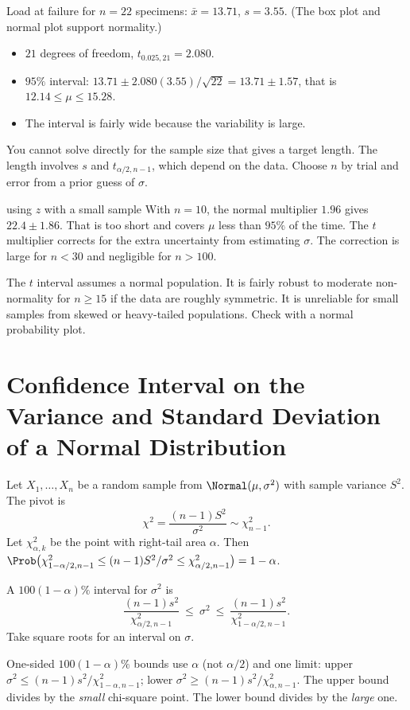 \begin{example}
Load at failure for $n=22$ specimens: $\bar{x}=13.71$, $s=3.55$. (The box plot and normal plot support normality.)
\begin{itemize}
  \item $21$ degrees of freedom, $t_{0.025,21}=2.080$.
  \item $95\%$ interval: $13.71\pm2.080(3.55)/\sqrt{22}=13.71\pm1.57$, that is $12.14\le\mu\le15.28$.
  \item The interval is fairly wide because the variability is large.
\end{itemize}
You cannot solve directly for the sample size that gives a target length. The length involves $s$ and $t_{\alpha/2,n-1}$, which depend on the data. Choose $n$ by trial and error from a prior guess of $\sigma$.
\end{example}

\begin{pitfall}{using $z$ with a small sample}
With $n=10$, the normal multiplier $1.96$ gives $22.4\pm1.86$. That is too short and covers $\mu$ less than $95\%$ of the time. The $t$ multiplier corrects for the extra uncertainty from estimating $\sigma$. The correction is large for $n<30$ and negligible for $n>100$.
\end{pitfall}

The $t$ interval assumes a normal population. It is fairly robust to moderate non-normality for $n\ge15$ if the data are roughly symmetric. It is unreliable for small samples from skewed or heavy-tailed populations. Check with a normal probability plot.

\section{Confidence Interval on the Variance and Standard Deviation of a Normal Distribution}

Let $X_1,\dots,X_n$ be a random sample from $\Normal(\mu,\sigma^2)$ with sample variance $S^2$. The pivot is
\[ \chi^2=\frac{(n-1)S^2}{\sigma^2}\sim\chi^2_{n-1}. \]
Let $\chi^2_{\alpha,k}$ be the point with right-tail area $\alpha$. Then $\Prob\big(\chi^2_{1-\alpha/2,n-1}\le(n-1)S^2/\sigma^2\le\chi^2_{\alpha/2,n-1}\big)=1-\alpha$.

\begin{theorem}\label{thm:var-ci}
A $100(1-\alpha)\%$ interval for $\sigma^2$ is
\[ \frac{(n-1)s^2}{\chi^2_{\alpha/2,n-1}}\ \le\ \sigma^2\ \le\ \frac{(n-1)s^2}{\chi^2_{1-\alpha/2,n-1}}. \]
Take square roots for an interval on $\sigma$.

One-sided $100(1-\alpha)\%$ bounds use $\alpha$ (not $\alpha/2$) and one limit: upper $\sigma^2\le(n-1)s^2/\chi^2_{1-\alpha,n-1}$; lower $\sigma^2\ge(n-1)s^2/\chi^2_{\alpha,n-1}$. The upper bound divides by the \emph{small} chi-square point. The lower bound divides by the \emph{large} one.
\end{theorem}


